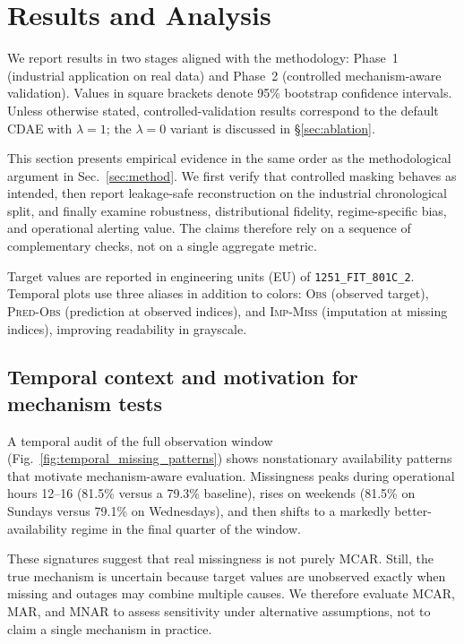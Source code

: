 \section{Results and Analysis}\label{sec:results}

We report results in two stages aligned with the methodology: Phase~1 (industrial application on real data) and Phase~2 (controlled mechanism-aware validation). Values in square brackets denote 95\% bootstrap confidence intervals. Unless otherwise stated, controlled-validation results correspond to the default CDAE with $\lambda=1$; the $\lambda=0$ variant is discussed in \S\ref{sec:ablation}.

This section presents empirical evidence in the same order as the methodological argument in Sec.~\ref{sec:method}. We first verify that controlled masking behaves as intended, then report leakage-safe reconstruction on the industrial chronological split, and finally examine robustness, distributional fidelity, regime-specific bias, and operational alerting value. The claims therefore rely on a sequence of complementary checks, not on a single aggregate metric.

Target values are reported in engineering units (EU) of \texttt{1251\_FIT\_801C\_2}. Temporal plots use three aliases in addition to colors: \textsc{Obs} (observed target), \textsc{Pred-Obs} (prediction at observed indices), and \textsc{Imp-Miss} (imputation at missing indices), improving readability in grayscale.

\subsection{Temporal context and motivation for mechanism tests}
A temporal audit of the full observation window (Fig.~\ref{fig:temporal_missing_patterns}) shows nonstationary availability patterns that motivate mechanism-aware evaluation. Missingness peaks during operational hours 12--16 (81.5\% versus a 79.3\% baseline), rises on weekends (81.5\% on Sundays versus 79.1\% on Wednesdays), and then shifts to a markedly better-availability regime in the final quarter of the window.

These signatures suggest that real missingness is not purely MCAR. Still, the true mechanism is uncertain because target values are unobserved exactly when missing and outages may combine multiple causes. We therefore evaluate MCAR, MAR, and MNAR to assess sensitivity under alternative assumptions, not to claim a single mechanism in practice.

